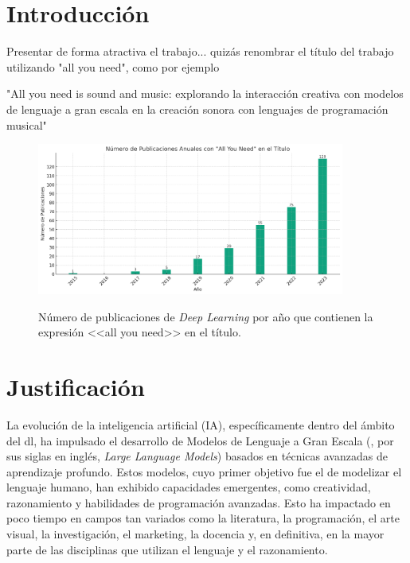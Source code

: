 \chapter{Introducción}

Presentar de forma atractiva el trabajo... quizás renombrar el título del trabajo utilizando "all you need", como por ejemplo 

"All you need is sound and music: explorando la interacción creativa con modelos de lenguaje a gran escala en la creación sonora con lenguajes de programación musical"


\begin{figure}[H]
    \caption[Número de publicaciones de \textit{Deep Learning} por año que contienen la expresión <<all you need>> en el título]{Número de publicaciones de \textit{Deep Learning} por año que contienen la expresión <<all you need>> en el título.}
    \centering
    \includegraphics[width=0.9\textwidth]{./figuras/all_you_need_publicacionies_anuales.png}
    \label{fig:all_you_need_publicaciones}
\end{figure}

\chapter{Justificación}

La evolución de la inteligencia artificial (IA), específicamente dentro del ámbito del \gls{dl}, ha impulsado el desarrollo de Modelos de Lenguaje a Gran Escala (, por sus siglas en inglés, \textit{Large Language Models}) basados en técnicas avanzadas de aprendizaje profundo. Estos modelos, cuyo primer objetivo fue el de modelizar el lenguaje humano, han exhibido capacidades emergentes, como creatividad, razonamiento y habilidades de programación avanzadas. Esto ha impactado en poco tiempo en campos tan variados como la literatura, la programación, el arte visual, la investigación, el marketing, la docencia y, en definitiva, en la mayor parte de las disciplinas que utilizan el lenguaje y el razonamiento.

